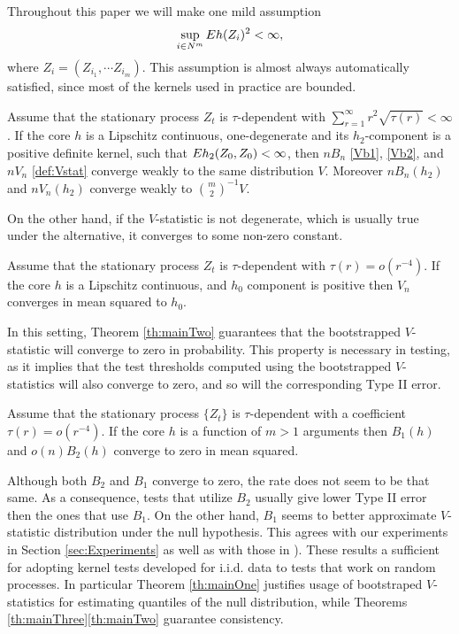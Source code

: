 Throughout this paper we will make one mild assumption
\[
  \sup_{i \in N^m}E h(Z_i)^2 < \infty,
 \]
 where $Z_i = (Z_{i_1},\cdots Z_{i_m})$. This assumption is almost always automatically satisfied, since most of the kernels used in practice are bounded.
\begin{Theorem}
\label{th:mainOne}
Assume that the stationary process $Z_t$ is $\tau$-dependent with $\sum_{r=1}^\infty r^2 \sqrt{\tau(r)} < \infty$. If the core $h$ is a Lipschitz continuous, one-degenerate and its $h_2$-component is a positive definite kernel, such that $E h_2(Z_0,Z_0) < \infty$, then $nB_n$ \eqref{Vb1}, \eqref{Vb2},  and $n V_n$  \eqref{def:Vstat} converge weakly to the same distribution $V$.  Moreover $nB_n(h_2)$ and $nV_n(h_2)$ converge weakly to $\binom {m} {2} ^{-1} V$.
\end{Theorem}

On the other hand, if the $V$-statistic is not degenerate, which is usually true under the alternative, it converges to some non-zero constant. 
\begin{Theorem}
\label{th:mainThree}
Assume that the stationary process $Z_t$ is $\tau$-dependent with $\tau(r) = o(r^{-4})$. If the core $h$ is a Lipschitz continuous, and  $h_0$ component is positive then  $V_n$ converges in mean squared to $h_0$.
\end{Theorem}
In this setting, Theorem \ref{th:mainTwo} guarantees that the bootstrapped $V$-statistic will converge to zero in probability. This property is necessary in testing, as it implies that the test thresholds computed using the bootstrapped $V$-statistics will also converge to zero, and so will the corresponding Type II error.   
\begin{Theorem}
\label{th:mainTwo}
Assume that the stationary process $\{Z_t\}$ is $\tau$-dependent with a coefficient $\tau(r) = o(r^{-4})$. If the core $h$ is  a function of $m>1$ arguments then $B_1(h)$ and $o(n) B_2(h)$  converge to zero in mean squared. 
\end{Theorem}
Although both $B_2$ and $B_1$  converge to zero, the rate does not seem to be that same. As a consequence, tests that utilize $B_2$ usually give lower Type II error then the ones that use $B_1$. On the other hand, $B_1$ seems to better approximate $V$-statistic distribution under the null hypothesis. This agrees with our experiments in Section \ref{sec:Experiments} as well as with those in \cite[Section 5]{leucht_dependent_2013}).  
These results a sufficient for adopting kernel tests developed for i.i.d. data to tests that work on random processes. In particular Theorem \ref{th:mainOne}  justifies usage of bootstraped $V$-statistics for estimating quantiles of the null distribution, while Theorems \ref{th:mainThree}\ref{th:mainTwo} guarantee consistency.

